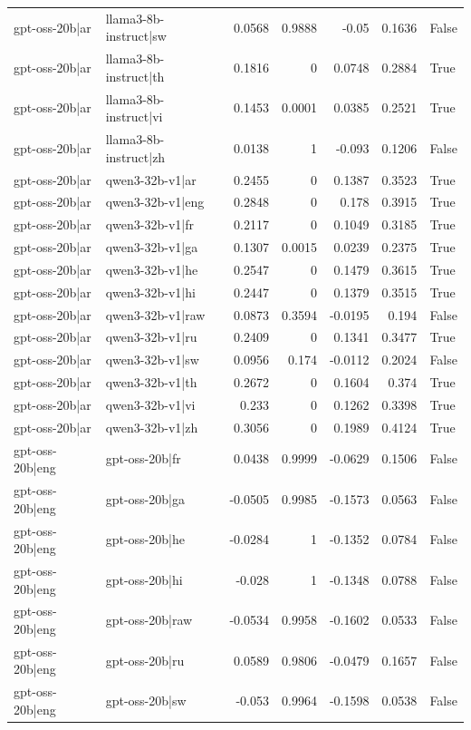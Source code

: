 \begin{table}
\begin{tabular}{l l r r r r l}
gpt-oss-20b|ar & llama3-8b-instruct|sw & 0.0568 & 0.9888 & -0.05 & 0.1636 & False \\
gpt-oss-20b|ar & llama3-8b-instruct|th & 0.1816 & 0 & 0.0748 & 0.2884 & True \\
gpt-oss-20b|ar & llama3-8b-instruct|vi & 0.1453 & 0.0001 & 0.0385 & 0.2521 & True \\
gpt-oss-20b|ar & llama3-8b-instruct|zh & 0.0138 & 1 & -0.093 & 0.1206 & False \\
gpt-oss-20b|ar & qwen3-32b-v1|ar & 0.2455 & 0 & 0.1387 & 0.3523 & True \\
gpt-oss-20b|ar & qwen3-32b-v1|eng & 0.2848 & 0 & 0.178 & 0.3915 & True \\
gpt-oss-20b|ar & qwen3-32b-v1|fr & 0.2117 & 0 & 0.1049 & 0.3185 & True \\
gpt-oss-20b|ar & qwen3-32b-v1|ga & 0.1307 & 0.0015 & 0.0239 & 0.2375 & True \\
gpt-oss-20b|ar & qwen3-32b-v1|he & 0.2547 & 0 & 0.1479 & 0.3615 & True \\
gpt-oss-20b|ar & qwen3-32b-v1|hi & 0.2447 & 0 & 0.1379 & 0.3515 & True \\
gpt-oss-20b|ar & qwen3-32b-v1|raw & 0.0873 & 0.3594 & -0.0195 & 0.194 & False \\
gpt-oss-20b|ar & qwen3-32b-v1|ru & 0.2409 & 0 & 0.1341 & 0.3477 & True \\
gpt-oss-20b|ar & qwen3-32b-v1|sw & 0.0956 & 0.174 & -0.0112 & 0.2024 & False \\
gpt-oss-20b|ar & qwen3-32b-v1|th & 0.2672 & 0 & 0.1604 & 0.374 & True \\
gpt-oss-20b|ar & qwen3-32b-v1|vi & 0.233 & 0 & 0.1262 & 0.3398 & True \\
gpt-oss-20b|ar & qwen3-32b-v1|zh & 0.3056 & 0 & 0.1989 & 0.4124 & True \\
gpt-oss-20b|eng & gpt-oss-20b|fr & 0.0438 & 0.9999 & -0.0629 & 0.1506 & False \\
gpt-oss-20b|eng & gpt-oss-20b|ga & -0.0505 & 0.9985 & -0.1573 & 0.0563 & False \\
gpt-oss-20b|eng & gpt-oss-20b|he & -0.0284 & 1 & -0.1352 & 0.0784 & False \\
gpt-oss-20b|eng & gpt-oss-20b|hi & -0.028 & 1 & -0.1348 & 0.0788 & False \\
gpt-oss-20b|eng & gpt-oss-20b|raw & -0.0534 & 0.9958 & -0.1602 & 0.0533 & False \\
gpt-oss-20b|eng & gpt-oss-20b|ru & 0.0589 & 0.9806 & -0.0479 & 0.1657 & False \\
gpt-oss-20b|eng & gpt-oss-20b|sw & -0.053 & 0.9964 & -0.1598 & 0.0538 & False \\

\end{tabular}
\end{table}
